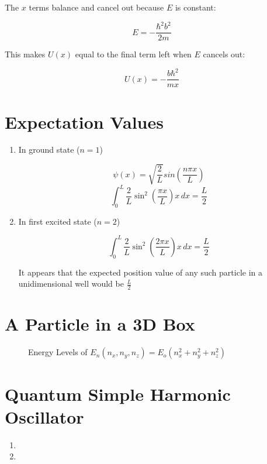 \begin{enumerate}
    The $x$ terms balance and cancel out because $E$ is constant:

    $$E=-\dfrac{\hbar^2b^2}{2m}$$

    This makes $U(x)$ equal to the final term left when $E$ cancels out:

    $$U(x)=-\dfrac{b\hbar^2}{mx}$$

    \section*{Expectation Values}

    \begin{enumerate}

      \item In ground state ($n=1$)

        $$\psi(x)=\sqrt{\dfrac{2}{L}}sin\left( \dfrac{n\pi x}{L} \right)$$
        $$\int_0^L \dfrac{2}{L}\sin^2\left( \dfrac{\pi x}{L} \right) x\,dx=\frac{L}{2}$$

      \item In first excited state ($n=2$)

        $$\int_0^L \dfrac{2}{L}\sin^2\left( \dfrac{2\pi x}{L} \right) x\,dx=\frac{L}{2}$$

        It appears that the expected position value of any such particle in a unidimensional well would be $\frac{L}{2}$

    \end{enumerate}

    \newpage

    \section*{A Particle in a 3D Box}

    \begin{figure}[h!]
      \centering
      
      \caption{Energy Levels of $E_n(n_x,n_y,n_z)=E_o(n_x^2+n_y^2+n_z^2)$}
      \label{fig:1}
    \end{figure}

    \section*{Quantum Simple Harmonic Oscillator}

    \begin{enumerate}

      \item 

      \item 

    \end{enumerate}

\end{enumerate}



